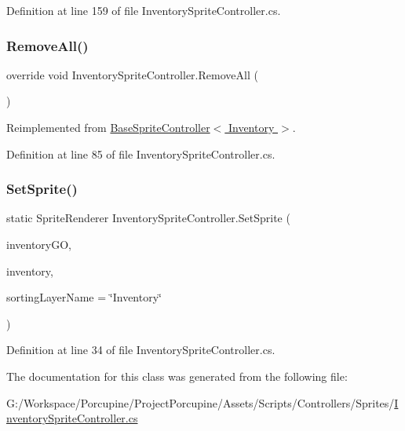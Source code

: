 Definition at line 159 of file Inventory\+Sprite\+Controller.\+cs.

\mbox{\label{class_inventory_sprite_controller_a60aa5f30a8947b7490e99592e0a87da2}} 
\subsubsection{\texorpdfstring{Remove\+All()}{RemoveAll()}}
{\footnotesize\ttfamily override void Inventory\+Sprite\+Controller.\+Remove\+All (\begin{DoxyParamCaption}{ }\end{DoxyParamCaption})\hspace{0.3cm}{\ttfamily [virtual]}}



Reimplemented from \hyperlink{class_base_sprite_controller_ae1fdf8c0abb1e362257540f2de80d6dc}{Base\+Sprite\+Controller$<$ Inventory $>$}.



Definition at line 85 of file Inventory\+Sprite\+Controller.\+cs.

\mbox{\label{class_inventory_sprite_controller_a4f3b1f386550c7458b0abc4fe276839e}} 
\subsubsection{\texorpdfstring{Set\+Sprite()}{SetSprite()}}
{\footnotesize\ttfamily static Sprite\+Renderer Inventory\+Sprite\+Controller.\+Set\+Sprite (\begin{DoxyParamCaption}\item[{Game\+Object}]{inventory\+GO,  }\item[{\hyperlink{class_inventory}{Inventory}}]{inventory,  }\item[{string}]{sorting\+Layer\+Name = {\ttfamily \char`\"{}Inventory\char`\"{}} }\end{DoxyParamCaption})\hspace{0.3cm}{\ttfamily [static]}}



Definition at line 34 of file Inventory\+Sprite\+Controller.\+cs.



The documentation for this class was generated from the following file\+:\begin{DoxyCompactItemize}
\item 
G\+:/\+Workspace/\+Porcupine/\+Project\+Porcupine/\+Assets/\+Scripts/\+Controllers/\+Sprites/\hyperlink{_inventory_sprite_controller_8cs}{Inventory\+Sprite\+Controller.\+cs}\end{DoxyCompactItemize}
